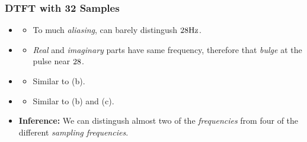 \documentclass[../../course]{subfiles}
\begin{document}
\subsubsection{DTFT with 32 Samples}

\begin{itemize} [label=]

    \item \sampFreqMuchLess
        \begin{itemize} [label=]
            \item To much \emph{aliasing}, can barely distingush $\freqXOne \si{Hz}$.
        \end{itemize}

    \item \sampFreqNorm
        \begin{itemize} [label=]
            \item \emph{Real} and \emph{imaginary} parts have same frequency, therefore that \emph{bulge}
                at the pulse near $\freqXOne$.
        \end{itemize}

    \item \sampFreqSligGreat
        \begin{itemize} [label=]
            \item Similar to (b).
        \end{itemize}

    \item \sampFreqMuchGreat
        \begin{itemize} [label=]
            \item Similar to (b) and (c).
        \end{itemize}

    \item \textbf{Inference:} We can distingush almost two of the \emph{frequencies} from four
        of the different \emph{sampling frequencies}.

\end{itemize}

\vfill
\end{document}
